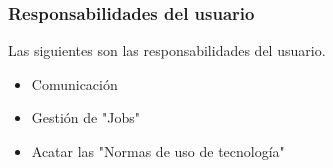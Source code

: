 \subsubsection{Responsabilidades del usuario}
Las siguientes son las responsabilidades del usuario.

\begin{itemize}
\item Comunicaci\'on
\item Gesti\'on de "Jobs"
\item Acatar las "Normas de uso de tecnolog\'ia"
\end{itemize}

